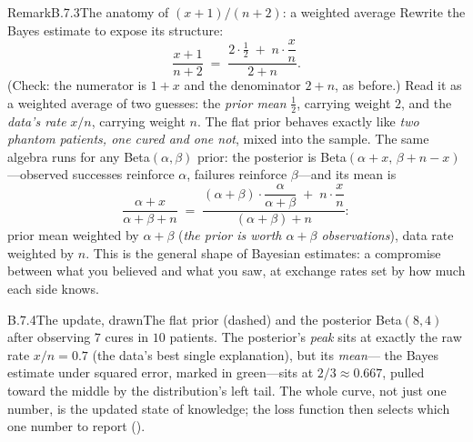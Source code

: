 \documentclass[main.tex]{subfiles}
\begin{document}
\begin{ObjL}{Remark}{B.7.3}{The anatomy of $(x+1)/(n+2)$: a weighted average}
Rewrite the Bayes estimate to expose its structure:
\[ \frac{x+1}{n+2}
   \;=\; \frac{2\cdot\tfrac12 \;+\; n\cdot\dfrac{x}{n}}{2+n} . \]
(Check: the numerator is $1+x$ and the denominator $2+n$, as before.) Read it as a weighted
average of two guesses: the \emph{prior mean} $\tfrac12$, carrying weight $2$, and the
\emph{data's rate} $x/n$, carrying weight $n$. The flat prior behaves exactly like
\emph{two phantom patients, one cured and one not}, mixed into the sample. The same algebra
runs for any Beta$(\alpha,\beta)$ prior: the posterior is
Beta$(\alpha+x,\,\beta+n-x)$---observed successes reinforce $\alpha$, failures reinforce
$\beta$---and its mean is
\[ \frac{\alpha+x}{\alpha+\beta+n}
   \;=\; \frac{(\alpha+\beta)\cdot\dfrac{\alpha}{\alpha+\beta} \;+\; n\cdot\dfrac{x}{n}}
   {(\alpha+\beta)+n} : \]
prior mean weighted by $\alpha+\beta$ (\emph{the prior is worth $\alpha+\beta$
observations}), data rate weighted by $n$. This is the general shape of Bayesian
estimates: a compromise between what you believed and what you saw, at exchange rates set
by how much each side knows.
\end{ObjL}

\begin{Fig}{B.7.4}{The update, drawn}{The flat prior (dashed) and the posterior
Beta$(8,4)$ after observing $7$ cures in $10$ patients. The posterior's \emph{peak} sits at
exactly the raw rate $x/n=0.7$ (the data's best single explanation), but its \emph{mean}---%
the Bayes estimate under squared error, marked in green---sits at $2/3\approx0.667$, pulled
toward the middle by the distribution's left tail. The whole curve, not just one number, is
the updated state of knowledge; the loss function then selects which one number to report
().}
\end{Fig}
\end{document}
